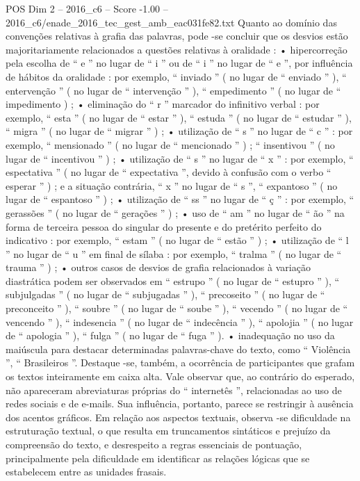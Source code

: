 \begin{textsample}{POS Dim 2 – 2016\_c6 – Score -1.00 – 2016\_c6/enade\_2016\_tec\_gest\_amb\_eac031fe82.txt}
Quanto ao domínio das convenções relativas à grafia das palavras, pode -se concluir que os desvios estão majoritariamente relacionados a questões relativas à oralidade : • hipercorreção pela escolha de “ e ” no lugar de “ i ” ou de “ i ” no lugar de “ e ”, por influência de hábitos da oralidade : por exemplo, “ inviado ” ( no lugar de “ enviado ” ), “ entervenção ” ( no lugar de “ intervenção ” ), “ empedimento ” ( no lugar de “ impedimento ) ; • eliminação do “ r ” marcador do infinitivo verbal : por exemplo, “ esta ” ( no lugar de “ estar ” ), “ estuda ” ( no lugar de “ estudar ” ), “ migra ” ( no lugar de “ migrar ” ) ; • utilização de “ s ” no lugar de “ c ” : por exemplo, “ mensionado ” ( no lugar de “ mencionado ” ) ; “ insentivou ” ( no lugar de “ incentivou ” ) ; • utilização de “ s ” no lugar de “ x ” : por exemplo, “ espectativa ” ( no lugar de “ expectativa ”, devido à confusão com o verbo “ esperar ” ) ; e a situação contrária, “ x ” no lugar de “ s ”, “ expantoso ” ( no lugar de “ espantoso ” ) ; • utilização de “ ss ” no lugar de “ ç ” : por exemplo, “ gerassões ” ( no lugar de “ gerações ” ) ; • uso de “ am ” no lugar de “ ão ” na forma de terceira pessoa do singular do presente e do pretérito perfeito do indicativo : por exemplo, “ estam ” ( no lugar de “ estão ” ) ; • utilização de “ l ” no lugar de “ u ” em final de sílaba : por exemplo, “ tralma ” ( no lugar de “ trauma ” ) ; • outros casos de desvios de grafia relacionados à variação diastrática podem ser observados em “ estrupo ” ( no lugar de “ estupro ” ), “ subjulgadas ” ( no lugar de “ subjugadas ” ), “ precoseito ” ( no lugar de “ preconceito ” ), “ soubre ” ( no lugar de “ soube ” ), “ vecendo ” ( no lugar de “ vencendo ” ), “ indesencia ” ( no lugar de “ indecência ” ), “ apolojia ” ( no lugar de “ apologia ” ), “ fulga ” ( no lugar de “ fuga ” ). • inadequação no uso da maiúscula para destacar determinadas palavras-chave do texto, como “ Violência ”, “ Brasileiros ”.
Destaque -se, também, a ocorrência de participantes que grafam os textos inteiramente em caixa alta.
Vale observar que, ao contrário do esperado, não apareceram abreviaturas próprias do “ internetês ”, relacionadas ao uso de redes sociais e de e-mails.
Sua influência, portanto, parece se restringir à ausência dos acentos gráficos.
Em relação aos aspectos textuais, observa -se dificuldade na estruturação textual, o que resulta em truncamentos sintáticos e prejuízo da compreensão do texto, e desrespeito a regras essenciais de pontuação, principalmente pela dificuldade em identificar as relações lógicas que se estabelecem entre as unidades frasais.

\end{textsample}
